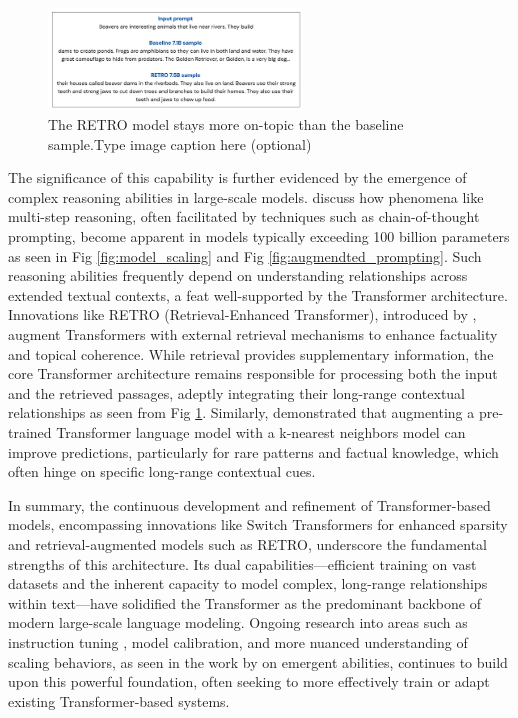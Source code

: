 \begin{figure}[htpb]
    \centering
    \includegraphics[width=0.6\textwidth]{../images/image-2.png} %
    \caption{The RETRO model stays more on-topic than the baseline sample.Type image caption here (optional)}
    \label{fig:retro}
\end{figure}

The significance of this capability is further evidenced by the emergence of complex reasoning abilities in large-scale models. \parencite{wei_emergent_2022} discuss how phenomena like multi-step reasoning, often facilitated by techniques such as chain-of-thought prompting, become apparent in models typically exceeding 100 billion parameters as seen in Fig \ref{fig:model_scaling} and Fig \ref{fig:augmendted_prompting}. Such reasoning abilities frequently depend on understanding relationships across extended textual contexts, a feat well-supported by the Transformer architecture. Innovations like RETRO (Retrieval-Enhanced Transformer), introduced by \parencite{borgeaud_improving_2021}, augment Transformers with external retrieval mechanisms to enhance factuality and topical coherence. While retrieval provides supplementary information, the core Transformer architecture remains responsible for processing both the input and the retrieved passages, adeptly integrating their long-range contextual relationships as seen from Fig \ref{fig:retro}. Similarly, \parencite{khandelwal_generalization_2020} demonstrated that augmenting a pre-trained Transformer language model with a k-nearest neighbors model can improve predictions, particularly for rare patterns and factual knowledge, which often hinge on specific long-range contextual cues.

In summary, the continuous development and refinement of Transformer-based models, encompassing innovations like Switch Transformers for enhanced sparsity and retrieval-augmented models such as RETRO, underscore the fundamental strengths of this architecture. Its dual capabilities—efficient training on vast datasets and the inherent capacity to model complex, long-range relationships within text—have solidified the Transformer as the predominant backbone of modern large-scale language modeling. Ongoing research into areas such as instruction tuning \parencite{tay_long_2021,chung_scaling_2022}, model calibration, and more nuanced understanding of scaling behaviors, as seen in the work by \parencite{wei_emergent_2022} on emergent abilities, continues to build upon this powerful foundation, often seeking to more effectively train or adapt existing Transformer-based systems.
